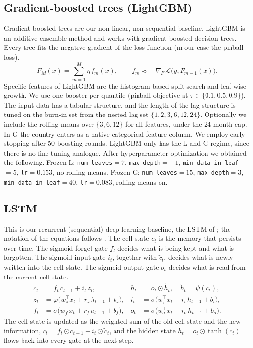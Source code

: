 \subsection{Gradient-boosted trees (LightGBM)}
\label{sec:models:lgbm}
Gradient-boosted trees are our non-linear, non-sequential baseline. LightGBM
\parencite{ke2017lightgbm} is an additive ensemble method and works with
gradient-boosted decision trees. Every
tree fits the negative gradient of the loss function (in our case the pinball
loss).
\begin{equation}
  F_M(x)=\sum_{m=1}^{M}\eta\,f_m(x),
  \qquad
  f_m\approx-\,\nabla_{\!F}\,\mathcal{L}\big(y,F_{m-1}(x)\big).
  \label{eq:gbdt}
\end{equation}
Specific features of LightGBM are the histogram-based split search and leaf-wise
growth. We use one booster per quantile (pinball objective at
$\tau\in\{0.1,0.5,0.9\}$). The input data has a tabular structure, and the length
of the lag structure is tuned on the burn-in set from the nested lag set
$\{1,2,3,6,12,24\}$. Optionally we include the rolling means over $\{3,6,12\}$ for
all features, under the 24-month cap. In G the country enters as a native
categorical feature column. We employ early stopping after 50 boosting rounds.
LightGBM only has the L and G regime, since there is no fine-tuning analogue.
After hyperparameter optimization we obtained the following. Frozen L:
\texttt{num\_leaves}$=7$, \texttt{max\_depth}$=-1$, \texttt{min\_data\_in\_leaf}$=5$,
\texttt{lr}$=0.153$, no rolling means. Frozen G: \texttt{num\_leaves}$=15$,
\texttt{max\_depth}$=3$, \texttt{min\_data\_in\_leaf}$=40$, \texttt{lr}$=0.083$,
rolling means on.

\subsection{LSTM}
\label{sec:models:lstm}
This is our recurrent (sequential) deep-learning baseline, the LSTM of
\textcite{hochreiter1997lstm}; the notation of the equations follows
\textcite{beck2024xlstm}. The cell state $c_t$ is
the memory that persists over time. The sigmoid forget gate $f_t$ decides what is
being kept and what is forgotten. The sigmoid input gate $i_t$, together with
$\tilde{c}_t$, decides what is newly written into the cell state. The sigmoid
output gate $o_t$ decides what is read from the current cell state.
\begin{align}
  c_t &= f_t\,c_{t-1} + i_t\,z_t, &
  h_t &= o_t\odot\tilde{h}_t,\quad \tilde{h}_t=\psi(c_t), \label{eq:lstm-ch}\\
  z_t &= \varphi\!\big(w_z^\top x_t + r_z\,h_{t-1} + b_z\big), &
  i_t &= \sigma\!\big(w_i^\top x_t + r_i\,h_{t-1} + b_i\big), \label{eq:lstm-zi}\\
  f_t &= \sigma\!\big(w_f^\top x_t + r_f\,h_{t-1} + b_f\big), &
  o_t &= \sigma\!\big(w_o^\top x_t + r_o\,h_{t-1} + b_o\big). \label{eq:lstm-fo}
\end{align}
The cell state is updated as the weighted sum of the old cell state and the new
information, $c_t = f_t\odot c_{t-1} + i_t\odot\tilde{c}_t$, and the hidden state
$h_t = o_t\odot\tanh(c_t)$ flows back into every gate at the next step.

